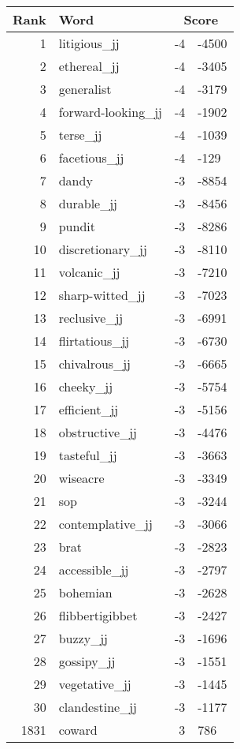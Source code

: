 \begin{longtable}[!htbp]{| rlr@{.}l |}
    \hline
    \textbf{Rank} & \textbf{Word} & \multicolumn{2}{c|}{\textbf{Score}} \\
    \hline
    \endhead
    1 & litigious\_jj & -4 & -4500 \\
    2 & ethereal\_jj & -4 & -3405 \\
    3 & generalist & -4 & -3179 \\
    4 & forward-looking\_jj & -4 & -1902 \\
    5 & terse\_jj & -4 & -1039 \\
    6 & facetious\_jj & -4 & -129 \\
    7 & dandy & -3 & -8854 \\
    8 & durable\_jj & -3 & -8456 \\
    9 & pundit & -3 & -8286 \\
    10 & discretionary\_jj & -3 & -8110 \\
    11 & volcanic\_jj & -3 & -7210 \\
    12 & sharp-witted\_jj & -3 & -7023 \\
    13 & reclusive\_jj & -3 & -6991 \\
    14 & flirtatious\_jj & -3 & -6730 \\
    15 & chivalrous\_jj & -3 & -6665 \\
    16 & cheeky\_jj & -3 & -5754 \\
    17 & efficient\_jj & -3 & -5156 \\
    18 & obstructive\_jj & -3 & -4476 \\
    19 & tasteful\_jj & -3 & -3663 \\
    20 & wiseacre & -3 & -3349 \\
    21 & sop & -3 & -3244 \\
    22 & contemplative\_jj & -3 & -3066 \\
    23 & brat & -3 & -2823 \\
    24 & accessible\_jj & -3 & -2797 \\
    25 & bohemian & -3 & -2628 \\
    26 & flibbertigibbet & -3 & -2427 \\
    27 & buzzy\_jj & -3 & -1696 \\
    28 & gossipy\_jj & -3 & -1551 \\
    29 & vegetative\_jj & -3 & -1445 \\
    30 & clandestine\_jj & -3 & -1177 \\
    1831 & coward & 3 & 786 \\

\end{longtable}
